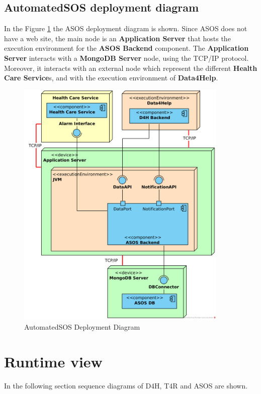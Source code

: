 \documentclass[a4paper, hidelinks, 12pt]{report}
\begin{document}
	\subsection{AutomatedSOS deployment diagram}
	In the Figure \ref{fig:asos_deployment_diagram} the ASOS deployment diagram is shown. Since ASOS does not have a web site, the main node is an \textbf{Application Server} that hosts the execution environment for the \textbf{ASOS Backend} component. The \textbf{Application Server} interacts with a \textbf{MongoDB Server} node, using the TCP/IP protocol. Moreover, it interacts with an external node which represent the different \textbf{Health Care Service}s, and with the execution environment of \textbf{Data4Help}.
		\begin{figure}[H]
			\centering
			\includegraphics[width=0.9\textwidth]{diagrams/asos_deployment_diagram.png}
			\caption[AutomatedSOS Deployment Diagram]{AutomatedSOS Deployment Diagram}
			\label{fig:asos_deployment_diagram}
		\end{figure}	
	
	\section{Runtime view}
	In the following section sequence diagrams of D4H, T4R and ASOS are shown. 
	
\end{document}
